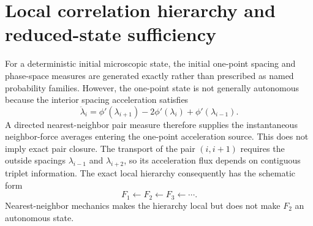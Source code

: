 
\section*{Local correlation hierarchy and reduced-state sufficiency}
For a deterministic initial microscopic state, the initial one-point spacing and phase-space measures are generated exactly rather than prescribed as named probability families. However, the one-point state is not generally autonomous because the interior spacing acceleration satisfies
\begin{equation}
\ddot\lambda_i
=\phi'(\lambda_{i+1})-2\phi'(\lambda_i)+\phi'(\lambda_{i-1}).
\end{equation}
A directed nearest-neighbor pair measure therefore supplies the instantaneous neighbor-force averages entering the one-point acceleration source. This does not imply exact pair closure. The transport of the pair $(i,i+1)$ requires the outside spacings $\lambda_{i-1}$ and $\lambda_{i+2}$, so its acceleration flux depends on contiguous triplet information. The exact local hierarchy consequently has the schematic form
\begin{equation}
F_1\leftarrow F_2\leftarrow F_3\leftarrow\cdots.
\end{equation}
Nearest-neighbor mechanics makes the hierarchy local but does not make $F_2$ an autonomous state.

